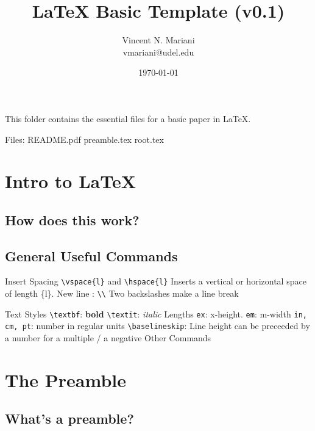 \documentclass[12pt]{article}
\author{Vincent N. Mariani\\vmariani@udel.edu}
\date{\today}
\title{LaTeX Basic Template (v0.1)}
\begin{document}
    \maketitle%

This folder contains the essential files for a basic paper in \LaTeX. 

\begin{outline}
    \0 Files:
        \1 README.pdf
        \1 preamble.tex
        \1 root.tex
\end{outline}


\tableofcontents

\section{Intro to \LaTeX}

\subsection{How does this work?}

\subsection{General Useful Commands}

\begin{outline}[itemize]
    \1 Insert Spacing
        \2 \texttt{\textbackslash vspace\{l\}} and \texttt{\textbackslash hspace\{l\}}
            \3 Inserts a vertical or horizontal space of length \{l\}.
        \2 New line : \texttt{\textbackslash\textbackslash}
            \3 Two backslashes make a line break

    \1 Text Styles
        \2 \texttt{\textbackslash textbf}: \textbf{bold}
        \2 \texttt{\textbackslash textit}: \textit{italic}
    \1 Lengths
        \2 \texttt{ex}: x-height. 
        \2 \texttt{em}: m-width
        \2 \texttt{in, cm, pt}: number in regular units
        \2 \texttt{\textbackslash baselineskip}:  Line height
            \3 can be preceeded by a number for a multiple / a negative
    \1 Other Commands
\end{outline}

\section{The Preamble}

\subsection{What's a preamble?}
\end{document}
